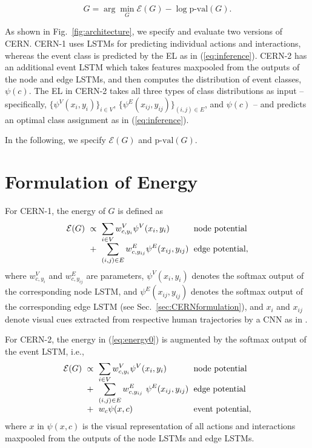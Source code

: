 \documentclass[10pt,twocolumn,letterpaper]{article}
\begin{document}
\begin{equation} 
\hat{G} = \arg\min_G \mathcal{E}(G) - \log \text{p-val}(G).
\label{eq:inference}
\end{equation}

As shown in Fig.~\ref{fig:architecture}, we specify and evaluate two versions of CERN. CERN-1 uses LSTMs for predicting individual actions and interactions, whereas the event class is predicted by the EL as in (\ref{eq:inference}). CERN-2 has an additional event LSTM which takes features maxpooled from the outputs of the node and edge LSTMs, and then computes the distribution of event classes, $\psi(c)$. The EL in CERN-2 takes all three types of class distributions as input -- specifically,  $\{\psi^V(x_i,y_i)\}_{i \in V}$, $\{\psi^E(x_{ij}, y_{ij})\}_{(i,j)\in E}$, and $\psi(c)$ -- and predicts an optimal class assignment as in (\ref{eq:inference}).

In the following, we specify $\mathcal{E}(G)$ and $\text{p-val}(G)$.

\section{Formulation of Energy } \label{sec:energy}

For CERN-1, the energy of $G$ is defined as
\begin{equation}
\setlength{\arraycolsep}{3pt}
\begin{array}{llll}
 \mathcal{E}(G) &\propto& \displaystyle \sum_{i 
\in V}  w^V_{c,y_i}\psi^V(x_i,y_i)  & \text{node potential}\\
 &+& \displaystyle \sum_{(i,j) \in E} w^E_{c,y_{ij}} \psi^E(x_{ij},y_{ij})  & \text{edge potential},
\end{array}
\label{eq:energy0}
\end{equation}
where $w^V_{c,y_i}$ and $w^E_{c,y_{ij}}$ are parameters,  $\psi^V(x_i,y_i)$ denotes the softmax output of the corresponding node LSTM, and $\psi^E(x_{ij},y_{ij})$ denotes  the softmax output of the corresponding edge LSTM (see Sec.~\ref{sec:CERNformulation}), and $x_i$ and $x_{ij}$ denote
visual cues extracted from respective human trajectories by a CNN as in \cite{Deng2016,Ibrahim2016}.

For CERN-2, the energy in (\ref{eq:energy0}) is augmented by the softmax output of the event LSTM, i.e., 
\begin{equation}
\setlength{\arraycolsep}{3pt}
\begin{array}{llll}
 \mathcal{E}(G) &\propto& \displaystyle \sum_{i 
\in V}  w^V_{c,y_i}\psi^V(x_i,y_i)  & \text{node potential}\\
 &+& \displaystyle \sum_{(i,j) \in E} w^E_{c,y_{ij}} \ \psi^E(x_{ij},y_{ij})  & \text{edge potential}\\
&+& \displaystyle w_c\psi(x, c) & \text{event potential},
\end{array}
\label{eq:energy0_2}
\end{equation}
where $x$ in $\psi(x, c)$ is the visual representation of all actions and interactions maxpooled from the outputs of the node LSTMs and edge LSTMs.
\end{document}
